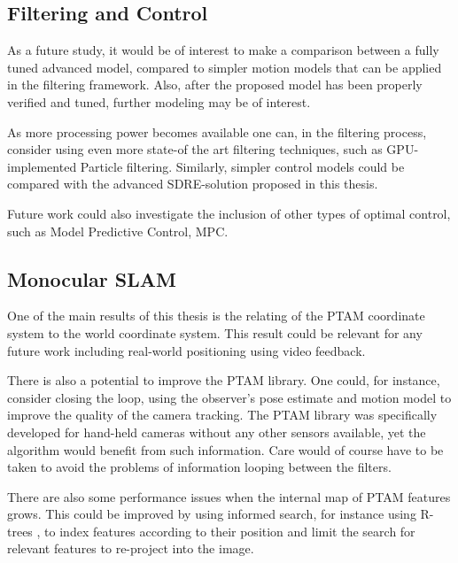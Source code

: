     \subsection{Filtering and Control}
        As a future study, it would be of interest to make a comparison between
        a fully tuned advanced model, compared to simpler motion models that
        can be applied in the filtering framework.
        Also, after the proposed model has been properly verified and tuned, further
        modeling may be of interest.

        As more processing power becomes available one can, in the filtering
        process, consider using even more state-of the art filtering techniques,
        such as GPU-implemented Particle filtering.
        Similarly, simpler control models could be compared with the
        advanced SDRE-solution proposed in this thesis.

        Future work could also investigate the inclusion of other types of
        optimal control, such as Model Predictive Control, MPC.

    \subsection{Monocular SLAM}
        One of the main results of this thesis is the relating of the PTAM
        coordinate system to the world coordinate system.
        This result could be relevant for any future work including real-world
        positioning using video feedback.

        There is also a potential to improve the PTAM library.
        One could, for instance, consider closing the loop, using the observer's
        pose estimate and motion model to improve the quality of the camera tracking.
        The PTAM library was specifically developed for hand-held cameras
        without any other sensors available, yet the algorithm would benefit
        from such information.
        Care would of course have to be taken to avoid the problems of
        information looping between the filters.

        There are also some performance issues when the internal map of PTAM features
        grows. This could be improved by using informed search,
        for instance using R-trees%
        , to index features according to their position and limit the search for
        relevant features to re-project into the image.
